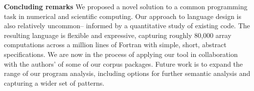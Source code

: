 

\textbf{Concluding remarks} \hspace{0.25em}
We proposed a novel solution to a common programming task in
numerical and scientific computing. Our approach to language design is
also relatively uncommon-- informed by a quantitative study of
existing code. The resulting language is flexible and expressive,
capturing roughly 80,000 array computations across a million lines of
Fortran with simple, short, abstract specifications. %
We are now in the
process of applying our tool in collaboration with
the authors' of some of our corpus packages.
Future work is to expand the range of our program analysis, including
options for further semantic analysis and capturing a wider set of
patterns.

